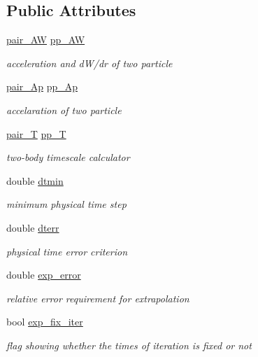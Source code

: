 \subsection*{Public Attributes}
\begin{DoxyCompactItemize}
\item 
\hyperlink{classARC_1_1chainpars_a9558124278a55c0301642e1df63be063}{pair\+\_\+\+AW} \hyperlink{classARC_1_1chainpars_a4be95af92d02bd0600b0983568f6eedb}{pp\+\_\+\+AW}
\begin{DoxyCompactList}\small\item\em acceleration and d\+W/dr of two particle \end{DoxyCompactList}\item 
\hyperlink{classARC_1_1chainpars_a80fcc6e3b5ce69025126bc49d90f233c}{pair\+\_\+\+Ap} \hyperlink{classARC_1_1chainpars_a7a12864e60dfa03ff5a258cf0eb472e8}{pp\+\_\+\+Ap}
\begin{DoxyCompactList}\small\item\em accelaration of two particle \end{DoxyCompactList}\item 
\hyperlink{classARC_1_1chainpars_a860194e916f3ae900e93beedd277fa3c}{pair\+\_\+T} \hyperlink{classARC_1_1chainpars_a7c32202cef65215a7bdfb71ca4e4acf8}{pp\+\_\+T}
\begin{DoxyCompactList}\small\item\em two-\/body timescale calculator \end{DoxyCompactList}\item 
double \hyperlink{classARC_1_1chainpars_a11a8ecf973a455e4b90ad6cdda49b3e0}{dtmin}
\begin{DoxyCompactList}\small\item\em minimum physical time step \end{DoxyCompactList}\item 
double \hyperlink{classARC_1_1chainpars_a6824d23b1d73f10512d851219fedf744}{dterr}
\begin{DoxyCompactList}\small\item\em physical time error criterion \end{DoxyCompactList}\item 
double \hyperlink{classARC_1_1chainpars_acd51cb7131052b15b230c235e4647360}{exp\+\_\+error}
\begin{DoxyCompactList}\small\item\em relative error requirement for extrapolation \end{DoxyCompactList}\item 
bool \hyperlink{classARC_1_1chainpars_a90a606b468790eb9d60ee90d7f233961}{exp\+\_\+fix\+\_\+iter}
\begin{DoxyCompactList}\small\item\em flag showing whether the times of iteration is fixed or not \end{DoxyCompactList}\end{DoxyCompactItemize}
